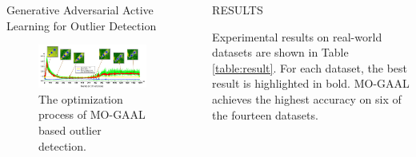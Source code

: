 \documentclass[final]{beamer}
\newlength{\sepwidth}
\newlength{\colwidth}
\newcommand{\separatorcolumn}{\begin{column}{\sepwidth}\end{column}}
\begin{document}
\begin{frame}[t]
\begin{columns}[t]
\begin{column}{\colwidth}
\begin{exampleblock}{Generative Adversarial Active Learning for Outlier Detection}
    \begin{figure}
        \centering
	    \includegraphics[scale=0.9]{figures/process of MO-GAAL.png}
	    \caption{The optimization process of MO-GAAL based outlier detection.}
    \end{figure}
  	
  \end{exampleblock}

\end{column}

\separatorcolumn

\begin{column}{\colwidth}
	
  \begin{block}{RESULTS}

    Experimental results on real-world datasets are shown in Table \ref{table:result}. For each dataset, the best result is highlighted in bold. MO-GAAL achieves the highest accuracy on six of the fourteen datasets.


\end{block}
\end{column}
\end{columns}
\end{frame}
\end{document}
